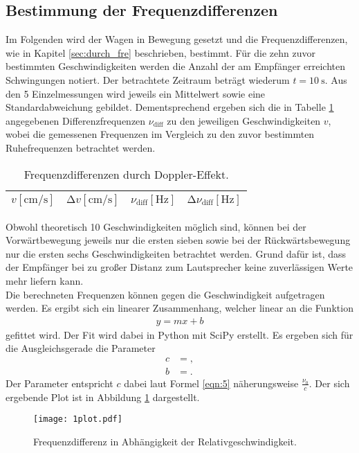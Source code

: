\subsection{Bestimmung der Frequenzdifferenzen}
Im Folgenden wird der Wagen in Bewegung gesetzt und die Frequenzdifferenzen, wie in Kapitel \ref{sec:durch_fre} beschrieben, bestimmt.
Für die zehn zuvor bestimmten Geschwindigkeiten werden die Anzahl der am Empfänger erreichten Schwingungen notiert.
Der betrachtete Zeitraum beträgt wiederum $t = \SI{10}{\second}$.
Aus den 5 Einzelmessungen wird jeweils ein Mittelwert sowie eine Standardabweichung gebildet.
Dementsprechend ergeben sich die in Tabelle \ref{tab:diffe} angegebenen Differenzfrequenzen $\nu_{\text{diff}}$ zu den jeweiligen Geschwindigkeiten $v$, wobei die gemessenen Frequenzen im Vergleich zu den zuvor bestimmten Ruhefrequenzen betrachtet werden.
\begin{table}
  \centering
  \caption{Frequenzdifferenzen durch Doppler-Effekt.}
  \label{tab:diffe}
  \begin{tabular}{c c c c}
    \toprule
    {$v [\si{\centi\metre\per\second}]$} & {$\increment{v} [\si{\centi\metre\per\second}]$} & {$\nu_{\text{diff}} [\si{\hertz}]$} & {$\increment{\nu_{\text{diff}}} [\si{\hertz}]$}\\
    \midrule
    
    \bottomrule
  \end{tabular}
\end{table}
Obwohl theoretisch 10 Geschwindigkeiten möglich sind, können bei der Vorwärtbewegung jeweils nur die ersten sieben sowie bei der Rückwärtsbewegung nur die ersten sechs Geschwindigkeiten betrachtet werden.
Grund dafür ist, dass der Empfänger bei zu großer Distanz zum Lautsprecher keine zuverlässigen Werte mehr liefern kann.\\

Die berechneten Frequenzen können gegen die Geschwindigkeit aufgetragen werden.
Es ergibt sich ein linearer Zusammenhang, welcher linear an die Funktion
\begin{align*}
  y = m x + b
\end{align*}
gefittet wird.
Der Fit wird dabei in Python mit SciPy erstellt.
Es ergeben sich für die Ausgleichsgerade die Parameter
\begin{align*}
  c &= , \\
  b &= .
\end{align*}
Der Parameter entspricht $c$ dabei laut Formel \ref{eqn:5} näherungsweise $\frac{ \nu_0}{c}$.
Der sich ergebende Plot ist in Abbildung \ref{afig:1} dargestellt.
\begin{figure}
  \centering
  \texttt{[image: 1plot.pdf]}
  \caption{Frequenzdifferenz in Abhängigkeit der Relativgeschwindigkeit.}
  \label{afig:1}
\end{figure}

